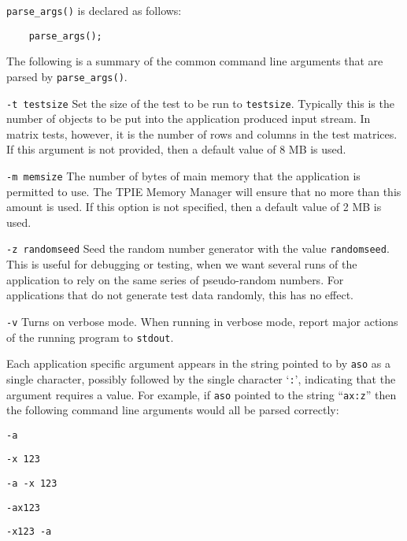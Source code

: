 
\lstinline|parse_args()| is declared as follows:

\begin{lstlisting}
    parse_args();
\end{lstlisting}


The following is a summary of the common command line arguments that
are parsed by \lstinline|parse_args()|.
\begin{description}
\item\lstinline|-t testsize| Set the size of the test to be run to
  \lstinline|testsize|.  Typically this is the number of objects to be
  put into the application produced input stream.  In matrix tests,
  however, it is the number of rows and columns in the test matrices.
  If this argument is not provided, then a default value of 8 MB is
  used.
\item\lstinline|-m memsize| The number of bytes of main memory that
  the application is permitted to use.  The TPIE Memory
  Manager will ensure that no more than this
  amount is used.  If this option is not specified, then a default
  value of 2 MB is used.
\item\lstinline|-z randomseed| Seed the random number generator with
  the value \lstinline|randomseed|.  This is useful for debugging or
  testing, when we want several runs of the application to rely on the
  same series of pseudo-random numbers.  For applications that do not
  generate test data randomly, this has no effect.
\item\lstinline|-v| Turns on verbose mode.  When running in verbose
  mode, report major actions of the running program to
  \lstinline|stdout|.
\end{description}

Each application specific argument appears in the string pointed to by
\lstinline|aso| as a single character, possibly followed by the single
character `\lstinline|:|', indicating that the argument requires a
value.  For example, if \lstinline|aso| pointed to the string
``\lstinline|ax:z|'' then the following command line arguments would
all be parsed correctly:

\begin{description}
\item\lstinline|-a|
\item\lstinline|-x 123|
\item\lstinline|-a -x 123|
\item\lstinline|-ax123|
\item\lstinline|-x123 -a|
\end{description}

